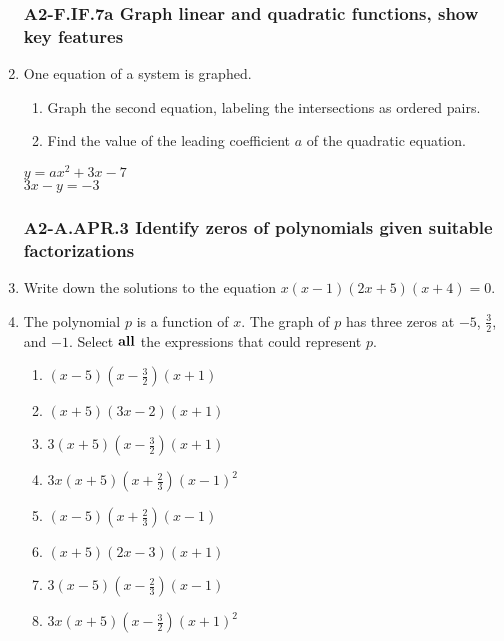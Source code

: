 \documentclass[12pt, twoside]{article}
\begin{document}
\begin{enumerate}[itemsep=0.5cm]
\newpage
\subsubsection*{A2-F.IF.7a Graph linear and quadratic functions, show key features}
\item One equation of a system is graphed. 
\begin{enumerate}
    \item Graph the second equation, labeling the intersections as ordered pairs.
    \item Find the value of the leading coefficient $a$ of the quadratic equation.
\end{enumerate}
\begin{multicols}{2}
    \hspace{1cm} $y = ax^2 + 3x - 7$ \\
    \columnbreak
    $3x - y = -3$
    \end{multicols}
     \vspace{3cm}

  \begin{center}
  \end{center}
  

\newpage
\subsubsection*{A2-A.APR.3 Identify zeros of polynomials given suitable factorizations}
\item Write down the solutions to the equation $x(x - 1)(2x + 5)(x + 4) = 0$. \vspace{2cm} 

\item The polynomial $p$ is a function of $x$. The graph of $p$ has three zeros at $-5$, $\frac{3}{2}$, and $-1$. Select $\bf{all}$ the expressions that could represent $p$. \vspace{0.25cm}
    \begin{multicols}{2}
    \begin{enumerate}
        \item $(x-5)(x-\frac{3}{2})(x+1)$
        \item $(x+5)(3x-2)(x+1)$
        \item $3(x+5)(x-\frac{3}{2})(x+1)$
        \item $3x(x+5)(x+\frac{2}{3})(x-1)^2$
        \item $(x-5)(x+\frac{2}{3})(x-1)$
        \item $(x+5)(2x-3)(x+1)$
        \item $3(x-5)(x-\frac{2}{3})(x-1)$
        \item $3x(x+5)(x-\frac{3}{2})(x+1)^2$
    \end{enumerate}
    \end{multicols}


\end{enumerate}
\end{document}
